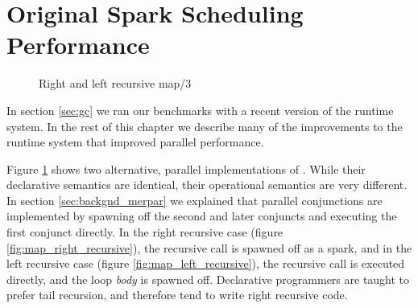 
\section{Original Spark Scheduling Performance}
\label{sec:original_scheduling_performance}

\begin{figure}
\begin{center}
%
\end{center}
\caption{Right and left recursive map/3}
\label{fig:map_right_and_left_recursive}
\end{figure}

In section \ref{sec:gc} we ran our benchmarks with a recent version of the
runtime system.
In the rest of this chapter we describe many of the improvements to the
runtime system that improved parallel performance.

Figure \ref{fig:map_right_and_left_recursive} shows two alternative, parallel
implementations of .
While their declarative semantics are identical,
their operational semantics are very different.
In section \ref{sec:backgnd_merpar} we explained that parallel conjunctions
are implemented by spawning off the second and later conjuncts and executing
the first conjunct directly.
In the right recursive case (figure \ref{fig:map_right_recursive}),
the recursive call is spawned off as a spark,
and in the left recursive case (figure \ref{fig:map_left_recursive}),
the recursive call is executed directly, and the loop \emph{body} is
spawned off.
Declarative programmers are taught to prefer tail recursion,
and therefore tend to write right recursive code.

